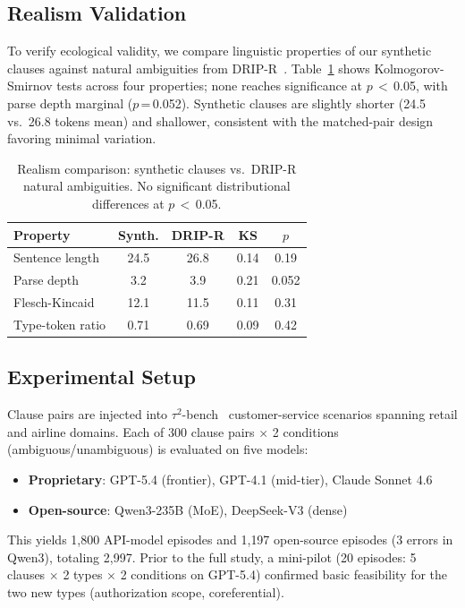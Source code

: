 \documentclass[11pt]{article}
\begin{document}
\subsection{Realism Validation}

To verify ecological validity, we compare linguistic properties of our synthetic clauses against natural ambiguities from DRIP-R~\cite{li2024drip}.
Table~\ref{tab:realism} shows Kolmogorov-Smirnov tests across four properties; none reaches significance at $p$\,$<$\,0.05, with parse depth marginal ($p$\,=\,0.052).
Synthetic clauses are slightly shorter (24.5 vs.\ 26.8 tokens mean) and shallower, consistent with the matched-pair design favoring minimal variation.

\begin{table}[t]
\centering
\small
\begin{tabular}{lcccc}
\toprule
\textbf{Property} & \textbf{Synth.} & \textbf{DRIP-R} & \textbf{KS} & \textbf{$p$} \\
\midrule
Sentence length & 24.5 & 26.8 & 0.14 & 0.19 \\
Parse depth & 3.2 & 3.9 & 0.21 & 0.052 \\
Flesch-Kincaid & 12.1 & 11.5 & 0.11 & 0.31 \\
Type-token ratio & 0.71 & 0.69 & 0.09 & 0.42 \\
\bottomrule
\end{tabular}
\caption{Realism comparison: synthetic clauses vs.\ DRIP-R natural ambiguities. No significant distributional differences at $p$\,$<$\,0.05.}
\label{tab:realism}
\end{table}

\subsection{Experimental Setup}

Clause pairs are injected into $\tau^2$-bench~\cite{tau2bench2024} customer-service scenarios spanning retail and airline domains.
Each of 300 clause pairs $\times$ 2 conditions (ambiguous/unambiguous) is evaluated on five models:

\begin{itemize}[nosep,leftmargin=*]
  \item \textbf{Proprietary}: GPT-5.4 (frontier), GPT-4.1 (mid-tier), Claude Sonnet 4.6
  \item \textbf{Open-source}: Qwen3-235B (MoE), DeepSeek-V3 (dense)
\end{itemize}

This yields 1{,}800 API-model episodes and 1{,}197 open-source episodes (3 errors in Qwen3), totaling 2{,}997.
Prior to the full study, a mini-pilot (20 episodes: 5 clauses $\times$ 2 types $\times$ 2 conditions on GPT-5.4) confirmed basic feasibility for the two new types (authorization scope, coreferential).
\end{document}
